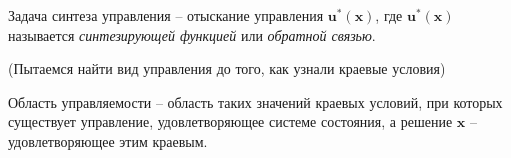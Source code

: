 
\begin{definition}
  Задача синтеза управления -- отыскание управления $\mathbf{u}^* (\mathbf{x})$, где
  $\mathbf{u}^*(\mathbf{x})$ называется \emph{синтезирующей функцией} или \emph{обратной связью}.
\end{definition}

(Пытаемся найти вид управления до того, как узнали краевые условия)

\begin{definition}
  Область управляемости -- область таких значений краевых условий, при которых существует
  управление, удовлетворяющее системе состояния, а решение $\mathbf{x}$ -- удовлетворяющее этим
  краевым.
\end{definition}



